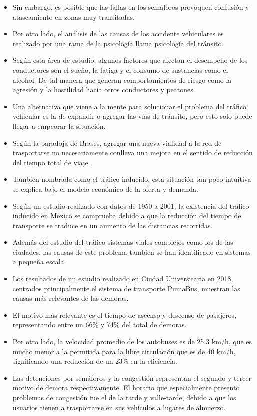 \documentclass[12pt]{article}
\begin{document}
\begin{itemize}
        \item Sin embargo, es posible que las fallas en los semáforos provoquen confusión y atascamiento en zonas muy transitadas.
        \item Por otro lado, el análisis de las causas de los accidente vehiculares es realizado por una rama de la psicología llama psicología del tránsito.
        \item Según esta área de estudio, algunos factores que afectan el desempeño de los conductores son el sueño, la fatiga y el consumo de sustancias como el alcohol. De tal manera que generan comportamientos de riesgo como la agresión y la hostilidad hacia otros conductores y peatones.
        \item Una alternativa que viene a la mente para solucionar el problema del tráfico vehicular es la de expandir o agregar las vías de tránsito, pero esto solo puede llegar a empeorar la situación.
        \item Según la paradoja de Brases, agregar una nueva vialidad a la red de trasportarse no necesariamente conlleva una mejora en el sentido de reducción del tiempo total de viaje.
        \item También nombrada como el tráfico inducido, esta situación tan poco intuitiva se explica bajo el modelo económico de la oferta y demanda. 
        \item Según un estudio realizado con datos de 1950 a 2001, la existencia del tráfico inducido en México se comprueba debido a que la reducción del tiempo de transporte se traduce en un aumento de las distancias recorridas. 
        \item Además del estudio del tráfico sistemas viales complejos como los de las ciudades, las causas de este problema también se han identificado en sistemas a pequeña escala.
        \item Los resultados de un estudio realizado en Ciudad Universitaria en 2018, centrados principalmente el sistema de transporte PumaBus, muestran las causas más relevantes de las demoras.
        \item El motivo más relevante es el tiempo de ascenso y descenso de pasajeros, representando entre un 66\% y 74\% del total de demoras. 
        \item Por otro lado, la velocidad promedio de los autobuses es de 25.3 km/h, que es mucho menor a la permitida para la libre circulación que es de 40 km/h, significando una reducción de un 23\% en la eficiencia.
        \item Las detenciones por semáforos y la congestión representan el segundo y tercer motivo de demora respectivamente. El horario que especialmente presento problemas de congestión fue el de la tarde y valle-tarde, debido a que los usuarios tienen a trasportarse en sus vehículos a lugares de almuerzo. 

\end{itemize}
\end{document}
